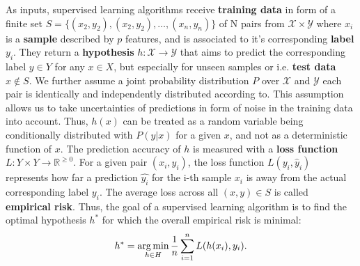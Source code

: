 As inputs, supervised learning algorithms receive \textbf{training data} in form of a finite set $ S = \{({x}_{2}, y_2), ({x}_{2}, y_2), \dots, ({x}_{n}, y_n)\}$ of N pairs from $ \mathcal{X} \times \mathcal{Y} $ where $ x_i $ is a \textbf{sample} described by $ p $ features, and is associated to it's corresponding \textbf{label} $ y_i $.
They return a \textbf{hypothesis} $ h: \mathcal{X} \to \mathcal{Y} $ that aims to predict the corresponding label $ y \in Y $ for any $ x \in X $, but especially for unseen samples or i.e. \textbf{test data} $ x \notin S $.
We further assume a joint probability distribution $ P $ over $ \mathcal{X} $ and $ \mathcal{Y} $ each pair is identically and independently distributed according to. 
This assumption allows us to take uncertainties of predictions in form of noise in the training data into account. 
Thus, $ h(x) $ can be treated as a random variable being conditionally distributed with $ P(y | x) $ for a given $ x $, and not as a deterministic function of $ x $.
The prediction accuracy of $ h $ is measured with a  \textbf{loss function} $ L : Y \times Y \to \mathbb{R}^{\geq 0}$.
For a given pair $ ({x}_i, y_i) $, the loss function $ L(y_i, \hat{y}_i) $ represents how far a prediction $ \hat{y_i} $ for the i-th sample $ x_i $ is away from the actual corresponding label $ y_i $. 
The average loss across all $ (x,y) \in S $ is called \textbf{empirical risk}.
Thus, the goal of a supervised learning algorithm is to find the optimal hypothesis $ h^* $ for which the overall empirical risk is minimal: 
\begin{equation}
	h^* = \operatorname*{arg\,min}_{h \in H} \dfrac{1}{n} \sum_{i=1}^{n} L(h(x_i), y_i).
\end{equation}

